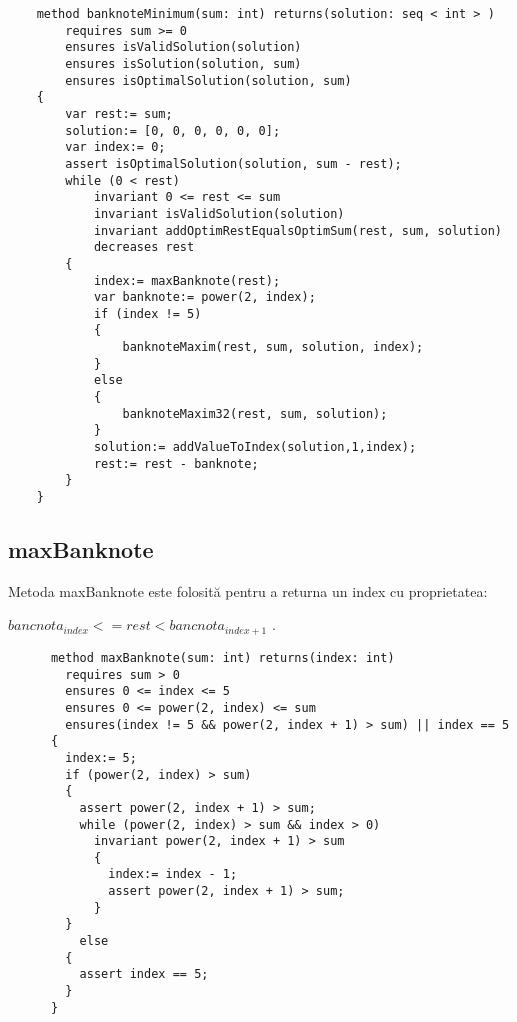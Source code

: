     \begin{lstlisting}
    method banknoteMinimum(sum: int) returns(solution: seq < int > )
        requires sum >= 0
        ensures isValidSolution(solution)
        ensures isSolution(solution, sum)
        ensures isOptimalSolution(solution, sum) 
    {
        var rest:= sum;
        solution:= [0, 0, 0, 0, 0, 0];
        var index:= 0;
        assert isOptimalSolution(solution, sum - rest);
        while (0 < rest)
            invariant 0 <= rest <= sum
            invariant isValidSolution(solution)
            invariant addOptimRestEqualsOptimSum(rest, sum, solution)
            decreases rest 
        {
            index:= maxBanknote(rest);
            var banknote:= power(2, index);
            if (index != 5) 
            {
                banknoteMaxim(rest, sum, solution, index);
            } 
            else 
            {
                banknoteMaxim32(rest, sum, solution);
            }
            solution:= addValueToIndex(solution,1,index);
            rest:= rest - banknote;
        }
    }
    \end{lstlisting}

    \subsection{maxBanknote}
    Metoda maxBanknote este folosită pentru a returna un index cu proprietatea: \par
     $bancnota_{index} <= rest < bancnota_{index + 1}$  .\par
    \begin{lstlisting}
      method maxBanknote(sum: int) returns(index: int)
        requires sum > 0
        ensures 0 <= index <= 5
        ensures 0 <= power(2, index) <= sum
        ensures(index != 5 && power(2, index + 1) > sum) || index == 5 
      {
        index:= 5;
        if (power(2, index) > sum) 
        {
          assert power(2, index + 1) > sum;
          while (power(2, index) > sum && index > 0)
            invariant power(2, index + 1) > sum 
            {
              index:= index - 1;
              assert power(2, index + 1) > sum;
            }
        } 
          else 
        {
          assert index == 5;
        }
      }
    \end{lstlisting}



